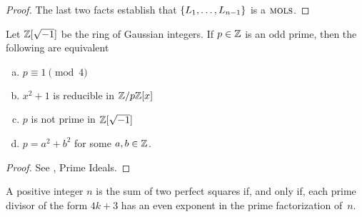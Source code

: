 \begin{proof}
    The last two facts establish that $\{L_1,\dots,L_{n-1}\}$ is a $\operatorname{\textsc{mols}}$.

\end{proof}

\newcommand{\iu}{\sqrt{-1}}
\begin{prop}
    Let\/ $\Z[\iu]$ be the ring of Gaussian integers. If\/ $p\in\mathbb{Z}$ is an odd prime, then the following are equivalent
    \begin{enumerate}[a),font=\upshape]
        \item $p\equiv1\pmod 4$
        \item $x^2+1$ is reducible in $\mathbb{Z}/p\mathbb{Z}[x]$
        \item $p$ is not prime in\/ $\Z[\iu]$
        \item $p=a^2+b^2$ for some $a,b\in\mathbb{Z}$.
    \end{enumerate}
\end{prop}

\begin{proof}
    See \citep{LC-Hopf}, Prime Ideals.
\end{proof}

\begin{cor}\label{cor:sum-of-squares}
    A positive integer\/ $n$ is the sum of two perfect squares if, and only if, each prime divisor of the form\/ $4k+3$ has an even exponent in the prime factorization of\/~$n$.
\end{cor}

